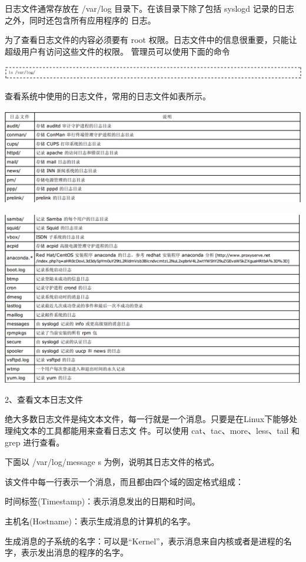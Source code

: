 \documentclass[letterpaper,10pt]{sphinxmanual}
\begin{document}
日志文件通常存放在 /var/log 目录下。在该目录下除了包括 syslogd 记录的日志之外，同时还包含所有应用程序的
日志。

为了查看日志文件的内容必须要有 root 权限。日志文件中的信息很重要，只能让超级用户有访问这些文件的权限。
管理员可以使用下面的命令

\includegraphics{lslog.png}

查看系统中使用的日志文件，常用的日志文件如表所示。

\includegraphics{log1.png}

\includegraphics{log2.png}

2、查看文本日志文件

绝大多数日志文件是纯文本文件，每一行就是一个消息。只要是在Linux下能够处理纯文本的工具都能用来查看日志文
件。可以使用 cat、tac、more、less、tail 和 grep 进行查看。

下面以 /var/log/message s 为例，说明其日志文件的格式。

该文件中每一行表示一个消息，而且都由四个域的固定格式组成：

时间标签(Timestamp)：表示消息发出的日期和时间。

主机名(Hostname)：表示生成消息的计算机的名字。

生成消息的子系统的名字：可以是“Kernel”，表示消息来自内核或者是进程的名字，表示发出消息的程序的名字。
\end{document}
